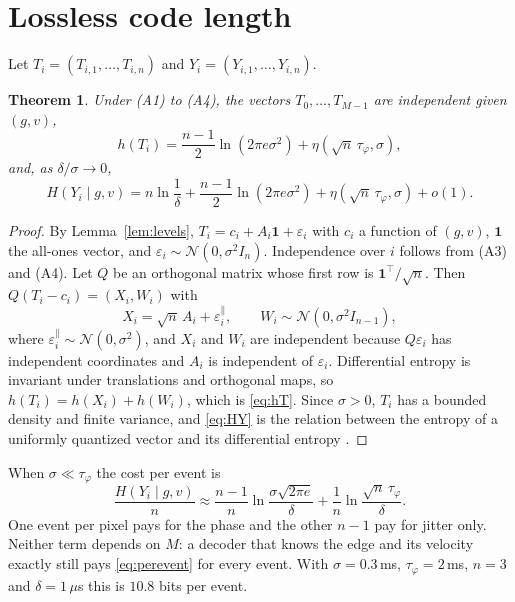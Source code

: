 \documentclass[10pt]{article}
\newtheorem{theorem}{Theorem}
\theoremstyle{remark}
\newcommand{\tphi}{\tau_\varphi}
\begin{document}
\section{Lossless code length}
Let $T_i=(T_{i,1},\dots,T_{i,n})$ and $Y_i=(Y_{i,1},\dots,Y_{i,n})$.
\begin{theorem}\label{thm:lossless}
Under (A1) to (A4), the vectors $T_0,\dots,T_{M-1}$ are independent given $(g,v)$,
\begin{equation}\label{eq:hT}
  h(T_i)=\frac{n-1}{2}\ln(2\pi e\sigma^2)+\eta(\sqrt n\,\tphi,\sigma),
\end{equation}
and, as $\delta/\sigma\to 0$,
\begin{equation}\label{eq:HY}
  H(Y_i\mid g,v)=n\ln\frac1\delta+\frac{n-1}{2}\ln(2\pi e\sigma^2)+\eta(\sqrt n\,\tphi,\sigma)+o(1).
\end{equation}
\end{theorem}
\begin{proof}
By Lemma~\ref{lem:levels}, $T_i=c_i+A_i\mathbf 1+\varepsilon_i$ with $c_i$ a function of $(g,v)$,
$\mathbf 1$ the all-ones vector, and $\varepsilon_i\sim\mathcal N(0,\sigma^2I_n)$. Independence
over $i$ follows from (A3) and (A4). Let $Q$ be an orthogonal matrix whose first row is
$\mathbf 1^{\!\top}/\sqrt n$. Then $Q(T_i-c_i)=(X_i,W_i)$ with
\begin{equation}\label{eq:XW}
  X_i=\sqrt n\,A_i+\varepsilon^{\parallel}_i,\qquad W_i\sim\mathcal N(0,\sigma^2I_{n-1}),
\end{equation}
where $\varepsilon^{\parallel}_i\sim\mathcal N(0,\sigma^2)$, and $X_i$ and $W_i$ are independent
because $Q\varepsilon_i$ has independent coordinates and $A_i$ is independent of $\varepsilon_i$.
Differential entropy is invariant under translations and orthogonal maps, so
$h(T_i)=h(X_i)+h(W_i)$, which is \eqref{eq:hT}. Since $\sigma>0$, $T_i$ has a bounded density and
finite variance, and \eqref{eq:HY} is the relation between the entropy of a uniformly quantized
vector and its differential entropy \cite[Ch.~8]{cover}.
\end{proof}
When $\sigma\ll\tphi$ the cost per event is
\begin{equation}\label{eq:perevent}
  \frac{H(Y_i\mid g,v)}{n}\approx\frac{n-1}{n}\ln\frac{\sigma\sqrt{2\pi e}}{\delta}+\frac1n\ln\frac{\sqrt n\,\tphi}{\delta}.
\end{equation}
One event per pixel pays for the phase and the other $n-1$ pay for jitter only. Neither term
depends on $M$: a decoder that knows the edge and its velocity exactly still pays
\eqref{eq:perevent} for every event. With $\sigma=0.3$\,ms, $\tphi=2$\,ms, $n=3$ and
$\delta=1\,\mu$s this is $10.8$ bits per event.
\end{document}
